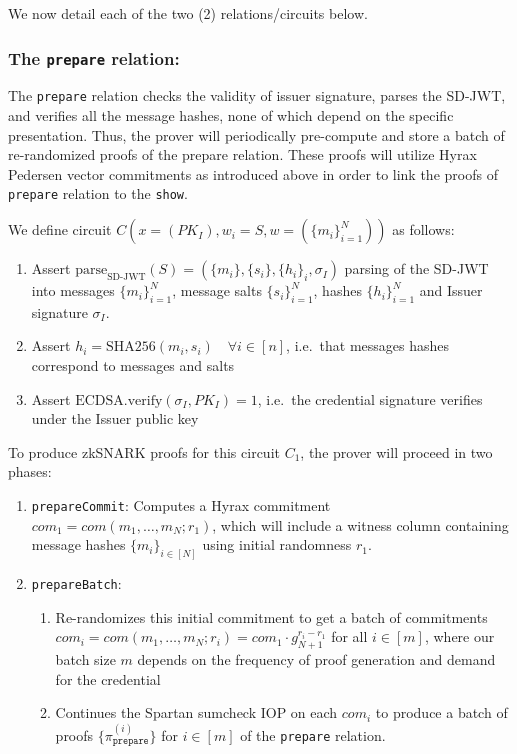 We now detail each of the two (2) relations/circuits below.

\subsubsection{The \texttt{prepare} relation:}

The \texttt{prepare} relation checks the validity of issuer signature, parses the SD-JWT, and verifies all the message hashes, none of which depend on the specific presentation. 
Thus, the prover will periodically pre-compute and store a batch of re-randomized proofs of the prepare relation. 
These proofs will utilize Hyrax Pedersen vector commitments as introduced above in order to link the proofs of \texttt{prepare} relation to the \texttt{show}. 

\begin{mdframed}[style=zkprotocolwithheader, frametitle=Circuit $C_1$ for the \texttt{prepare} relation]

We define circuit $C(x = (PK_I), w_i = S, w = (\{m_i\}_{i=1}^N))$ as follows:

\begin{enumerate}
\item Assert $\text{parse}_{\text{SD-JWT}}(S) = (\{m_i\}, \{s_i\}, \{h_i\}_i, \sigma_I)$ parsing of the SD-JWT into messages $\{m_i\}_{i=1}^N$, message salts $\{s_i\}_{i=1}^N$, hashes $\{h_i\}_{i=1}^N$ and Issuer signature $\sigma_I$.
\item Assert $h_i = \text{SHA256}(m_i, s_i) \quad \forall i \in [n]$, i.e.\ that messages hashes correspond to messages and salts
\item Assert $\text{ECDSA.verify}(\sigma_I, PK_I) = 1$, i.e.\ the credential signature verifies under the Issuer public key
\end{enumerate}

\end{mdframed}

To produce zkSNARK proofs for this circuit $C_1$, the prover will proceed in two phases:
\begin{enumerate}
\item \texttt{prepareCommit}: Computes a Hyrax commitment $com_1 = com(m_1, \dots, m_N; r_1)$, which will include a witness column containing message hashes $\{m_i\}_{i \in [N]}$ using initial randomness $r_1$. 
\item \texttt{prepareBatch}: 
    \begin{enumerate}
        \item Re-randomizes this initial commitment to get a batch of commitments $com_i = com(m_1, \dots, m_N; r_i) = com_1 \cdot g_{N+1}^{r_i-r_1}$ for all $i \in [m]$, 
        where our batch size $m$ depends on the frequency of proof generation and demand for the credential
        \item Continues the Spartan sumcheck IOP on each $com_i$ to produce a batch of proofs $\{\pi_{\texttt{prepare}}^{(i)}\}$ for $i \in [m]$ of the \texttt{prepare} relation.
    \end{enumerate}
\end{enumerate}
    
